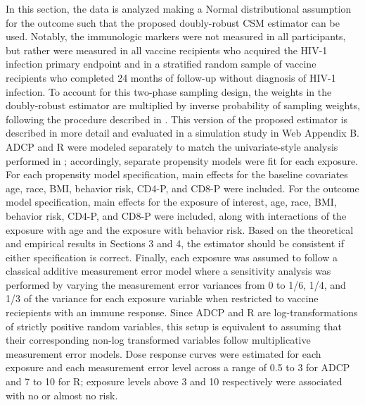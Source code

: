 \documentclass[useAMS,usenatbib,referee]{biom}
\newcommand{\RNum}[1]{\uppercase\expandafter{\romannumeral #1\relax}}
\begin{document}
In this section, the data is analyzed making a Normal distributional assumption for the outcome such that the proposed doubly-robust CSM estimator can be used. Notably, the immunologic markers were not measured in all participants, but rather were measured in all vaccine recipients who acquired the HIV-1 infection primary endpoint and in a stratified random sample of vaccine recipients who completed 24 months of follow-up without diagnosis of HIV-1 infection. To account for this two-phase sampling design, the weights in the doubly-robust estimator are multiplied by inverse probability of sampling weights, following the procedure described in \citet{wang2009}. This version of the proposed estimator is described in more detail and evaluated in a simulation study in Web Appendix B. ADCP and R\RNum{2} were modeled separately to match the univariate-style analysis performed in \citet{neidich2019}; accordingly, separate propensity models were fit for each exposure. For each propensity model specification, main effects for the baseline covariates age, race, BMI, behavior risk, CD4-P, and CD8-P were included. For the outcome model specification, main effects for the exposure of interest, age, race, BMI, behavior risk, CD4-P, and CD8-P were included, along with interactions of the exposure with age and the exposure with behavior risk. Based on the theoretical and empirical results in Sections 3 and 4, the estimator should be consistent if either specification is correct. Finally, each exposure was assumed to follow a classical additive measurement error model where a sensitivity analysis was performed by varying the measurement error variances from 0 to 1/6, 1/4, and 1/3 of the variance for each exposure variable when restricted to vaccine reciepients with an immune response. Since ADCP and R\RNum{2} are log-transformations of strictly positive random variables, this setup is equivalent to assuming that their corresponding non-log transformed variables follow multiplicative measurement error models. Dose response curves were estimated for each exposure and each measurement error level across a range of 0.5 to 3 for ADCP and 7 to 10 for R\RNum{2}; exposure levels above 3 and 10 respectively were associated with no or almost no risk.
\end{document}
